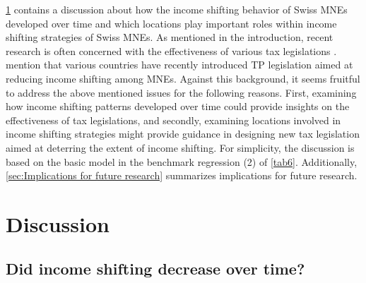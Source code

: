 \documentclass[10pt,twocolumn,oneside,cmyk]{article}
\begin{document}
\cref{sec:Discussion} contains a discussion about how the income shifting behavior of Swiss MNEs developed over time and which locations play important roles within income shifting strategies of Swiss MNEs. As mentioned in the introduction, recent research is often concerned with the effectiveness of various tax legislations \parencite{beuselinck_cross-jurisdictional_2015}. \textcite[1]{lohse_impact_2012} mention that various countries have recently introduced TP legislation aimed at reducing income shifting among MNEs. Against this background, it seems fruitful to address the above mentioned issues for the following reasons. First, examining how income shifting patterns developed over time could provide insights on the effectiveness of tax legislations, and secondly, examining locations involved in income shifting strategies might provide guidance in designing new tax legislation aimed at deterring the extent of income shifting. For simplicity, the discussion is based on the basic model in the benchmark regression (2) of \cref{tab6}. Additionally, \cref{sec:Implications for future research} summarizes implications for future research.

\section{Discussion} \label{sec:Discussion}
\subsection{Did income shifting decrease over time?} \label{sec:Did income shifting decrease over time?}
\end{document}
